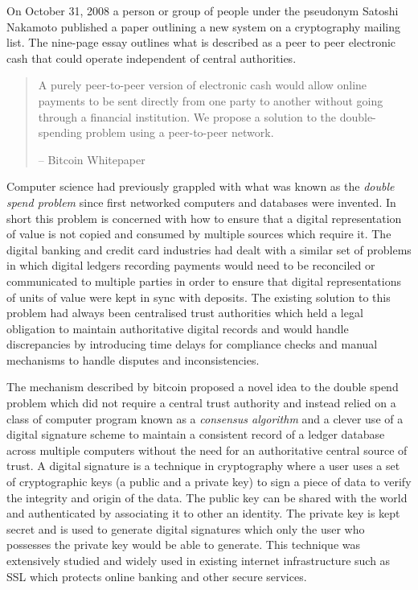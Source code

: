On October 31, 2008 a person or group of people under the pseudonym
Satoshi Nakamoto published\cite{nakamoto2019bitcoin} a paper outlining a new system on a
cryptography mailing list. The nine-page essay outlines what is
described as a peer to peer electronic cash that could operate
independent of central authorities.


\begin{quote}
A purely peer-to-peer version of electronic cash would allow online
payments to be sent directly from one party to another without going
through a financial institution. We propose a solution to the
double-spending problem using a peer-to-peer network.
\begin{flushright}
-- Bitcoin Whitepaper
\end{flushright}
\end{quote}

Computer science had previously grappled with what was known as the
\textit{double spend problem} since first networked computers and databases were
invented. In short this problem is concerned with how to ensure that a digital
representation of value is not copied and consumed by multiple sources which
require it. The digital banking and credit card industries had dealt with a
similar set of problems in which digital ledgers recording payments would need
to be reconciled or communicated to multiple parties in order to ensure that
digital representations of units of value were kept in sync with deposits. The
existing solution to this problem had always been centralised trust authorities
which held a legal obligation to maintain authoritative digital records and
would handle discrepancies by introducing time delays for compliance checks and
manual mechanisms to handle disputes and inconsistencies.


The mechanism described by bitcoin proposed a novel idea to the double spend
problem which did not require a central trust authority and instead relied on a
class of computer program known as a \textit{consensus algorithm} and a clever
use of a digital signature scheme to maintain a consistent record of a ledger
database across multiple computers without the need for an authoritative central
source of trust. A digital signature is a technique in cryptography where a user
uses a set of cryptographic keys (a public and a private key) to sign a piece of
data to verify the integrity and origin of the data. The public key can be
shared with the world and authenticated by associating it to other an identity.
The private key is kept secret and is used to generate digital signatures which
only the user who possesses the private key would be able to generate. This
technique was extensively studied and widely used in existing internet
infrastructure such as SSL which protects online banking and other secure
services.

